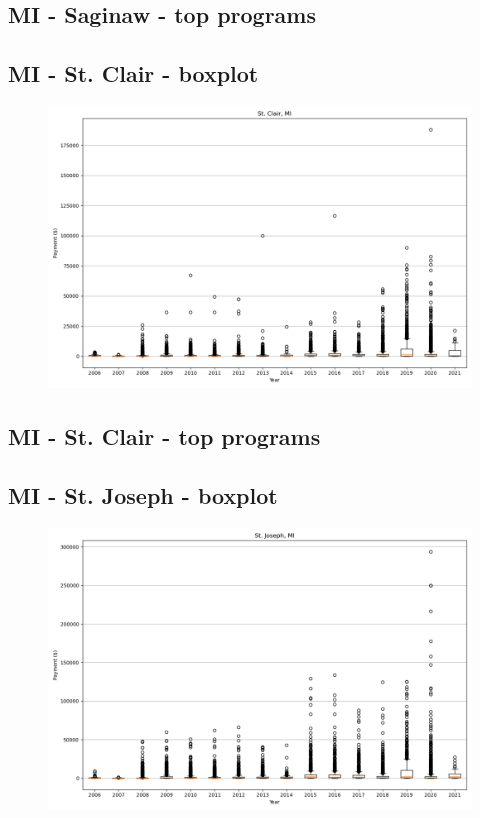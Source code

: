 \subsection*{MI - Saginaw - top programs}

\newpage
\subsection*{MI - St. Clair - boxplot}
\begin{figure}[h]
\centering
\includegraphics[width=7in]{../output/boxplots/counties/St. Clair-MI_boxplot.png}
\end{figure}


\subsection*{MI - St. Clair - top programs}

\newpage
\subsection*{MI - St. Joseph - boxplot}
\begin{figure}[h]
\centering
\includegraphics[width=7in]{../output/boxplots/counties/St. Joseph-MI_boxplot.png}
\end{figure}


